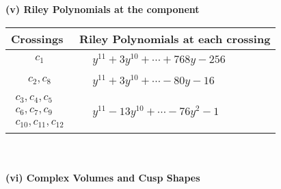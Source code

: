 \documentclass[1p]{elsarticle_modified}
\theoremstyle{definition}
\begin{document}
\newpage\renewcommand{\arraystretch}{1}
\flushleft \textbf{(v) Riley Polynomials at the component}\newline \\
\begin{tabular}{m{50pt}|m{274pt}}
Crossings & \hspace{64pt}Riley Polynomials at each crossing \\
\hline $$\begin{aligned}c_{1}\end{aligned}$$&$\begin{aligned}
&y^{11}+3 y^{10}+\cdots+768 y-256
\end{aligned}$\\
\hline $$\begin{aligned}c_{2},c_{8}\end{aligned}$$&$\begin{aligned}
&y^{11}+3 y^{10}+\cdots-80 y-16
\end{aligned}$\\
\hline $$\begin{aligned}c_{3},c_{4},c_{5}\\c_{6},c_{7},c_{9}\\c_{10},c_{11},c_{12}\end{aligned}$$&$\begin{aligned}
&y^{11}-13 y^{10}+\cdots-76 y^2-1
\end{aligned}$\\
\hline
\end{tabular}\\~\\
\newpage\flushleft \textbf{(vi) Complex Volumes and Cusp Shapes}
\end{document}
